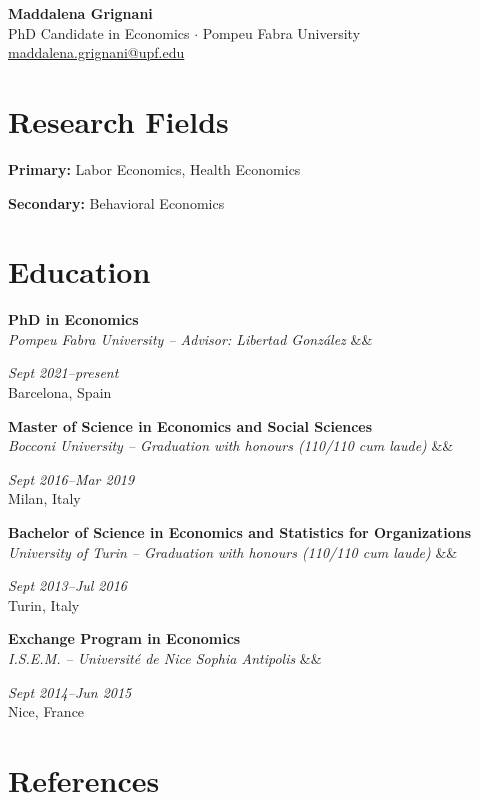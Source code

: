 \documentclass[11pt, a4paper]{article}
\newcommand{\cventry}[5]{%
  \begin{minipage}[t]{0.78\textwidth}
    \textbf{#1}\\[-2pt]
    \textit{\small #2}%
    \ifx&#5&\else\\[1pt]{\small #5}\fi
  \end{minipage}%
  \hfill%
  \begin{minipage}[t]{0.2\textwidth}
    \raggedleft\small
    \textit{#4}\\
    #3
  \end{minipage}%
  \par\vspace{5pt}%
}
\begin{document}
\begin{center}
  {\LARGE \textbf{Maddalena Grignani}}\\[4pt]
  PhD Candidate in Economics $\cdot$ Pompeu Fabra University\\[2pt]
  \href{mailto:maddalena.grignani@upf.edu}{maddalena.grignani@upf.edu}
\end{center}

\vspace{6pt}

\section{Research Fields}

\textbf{Primary:} Labor Economics, Health Economics

\textbf{Secondary:} Behavioral Economics

\section{Education}

\cventry{PhD in Economics}%
  {Pompeu Fabra University \textmd{-- Advisor: Libertad González}}%
  {Barcelona, Spain}{Sept 2021--present}{}

\cventry{Master of Science in Economics and Social Sciences}%
  {Bocconi University \textmd{-- Graduation with honours (110/110 cum laude)}}%
  {Milan, Italy}{Sept 2016--Mar 2019}{}

\cventry{Bachelor of Science in Economics and Statistics for Organizations}%
  {University of Turin \textmd{-- Graduation with honours (110/110 cum laude)}}%
  {Turin, Italy}{Sept 2013--Jul 2016}{}

\cventry{Exchange Program in Economics}%
  {I.S.E.M. -- Université de Nice Sophia Antipolis}%
  {Nice, France}{Sept 2014--Jun 2015}{}

\section{References}
\end{document}
